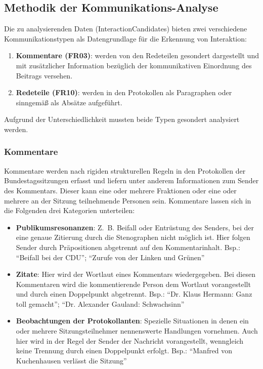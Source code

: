\subsection{Methodik der Kommunikations-Analyse}
Die zu analysierenden Daten (InteractionCandidates) bieten zwei verschiedene
Kommunikationstypen als Datengrundlage für die Erkennung von Interaktion:

\begin{enumerate}
    \item \textbf{Kommentare (FR03)}: werden von den Redeteilen gesondert
        dargestellt und mit zusätzlicher Information bezüglich der
        kommunikativen Einordnung des Beitrags versehen.
    \item \textbf{Redeteile (FR10)}: werden in den Protokollen als
        Paragraphen oder sinngemäß als Absätze aufgeführt.
\end{enumerate}

Aufgrund der Unterschiedlichkeit mussten beide Typen gesondert analysiert werden.

\subsubsection{Kommentare}

Kommentare werden nach rigiden strukturellen Regeln in den Protokollen der
Bundestagssitzungen erfasst und liefern unter anderem Informationen zum
Sender des Kommentars. Dieser kann eine oder mehrere Fraktionen oder eine
oder mehrere an der Sitzung teilnehmende Personen sein. Kommentare lassen sich
in die Folgenden drei Kategorien unterteilen:

\begin{itemize}
    \item \textbf{Publikumsresonanzen}: Z.~B. Beifall oder Entrüstung des
        Senders, bei der eine genaue Zitierung durch die Stenographen nicht
        möglich ist. Hier folgen Sender durch Präpositionen abgetrennt auf
        den Kommentarinhalt. Bsp.: \enquote{Beifall bei der CDU};
        \enquote{Zurufe von der Linken und Grünen}

    \item \textbf{Zitate}: Hier wird der Wortlaut eines Kommentars
        wiedergegeben. Bei diesen Kommentaren wird die kommentierende Person
        dem Wortlaut vorangestellt und durch einen Doppelpunkt abgetrennt.
        Bsp.: \enquote{Dr. Klaus Hermann: Ganz toll gemacht}; \enquote{Dr.
        Alexander Gauland: Schwachsinn}

    \item \textbf{Beobachtungen der Protokollanten}: Spezielle Situationen in
        denen ein oder mehrere Sitzungsteilnehmer nennenswerte Handlungen
        vornehmen. Auch hier wird in der Regel der Sender der Nachricht
        vorangestellt, wenngleich keine Trennung durch einen Doppelpunkt
        erfolgt. Bsp.: \enquote{Manfred von Kuchenhausen verlässt die Sitzung}

\end{itemize}

